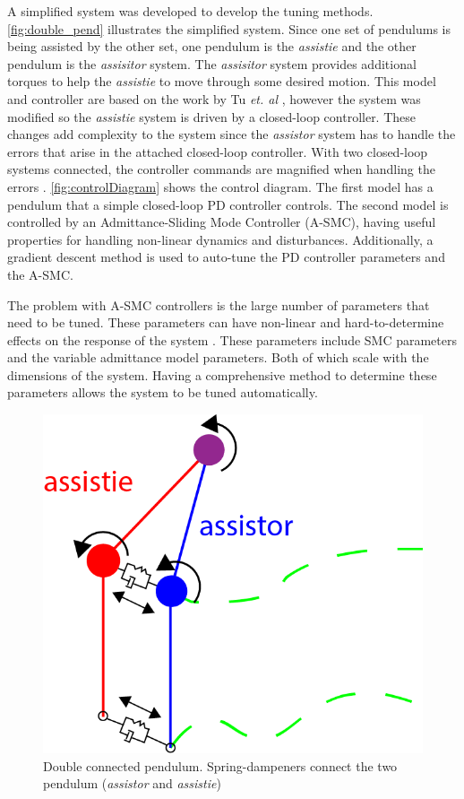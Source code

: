 A simplified system was developed to develop the tuning methods. \autoref{fig:double_pend} illustrates the simplified system. Since one set of pendulums is being assisted by the other set, one pendulum is the \textit{assistie} and the other pendulum is the \textit{assisitor} system. The \textit{assisitor} system provides additional torques to help the \textit{assistie} to move through some desired motion. This model and controller are based on the work by Tu \textit{et. al} \cite{tu2020adaptive}, however the system was modified so the \textit{assistie} system is driven by a closed-loop controller. These changes add complexity to the system since the \textit{assistor} system has to handle the errors that arise in the attached closed-loop controller. With two closed-loop systems connected, the controller commands are magnified when handling the errors \cite{tu2020adaptive}. \autoref{fig:controlDiagram} shows the control diagram. The first model has a pendulum that a simple closed-loop PD controller controls. The second model is controlled by an Admittance-Sliding Mode Controller (A-SMC), having useful properties for handling non-linear dynamics and disturbances. Additionally, a gradient descent method is used to auto-tune the PD controller parameters and the A-SMC. 

The problem with A-SMC controllers is the large number of parameters that need to be tuned. These parameters can have non-linear and hard-to-determine effects on the response of the system \cite{slotine1983tracking}. These parameters include SMC parameters and the variable admittance model parameters. Both of which scale with the dimensions of the system. Having a comprehensive method to determine these parameters allows the system to be tuned automatically.  

\begin{figure}
    \centering
    \includegraphics[scale=1.5]{images/controllers/double_pend.png}
    \caption[Double connected pendulum]{Double connected pendulum. Spring-dampeners connect the two pendulum (\textit{assistor} and \textit{assistie}) }
    \label{fig:double_pend}
\end{figure}

